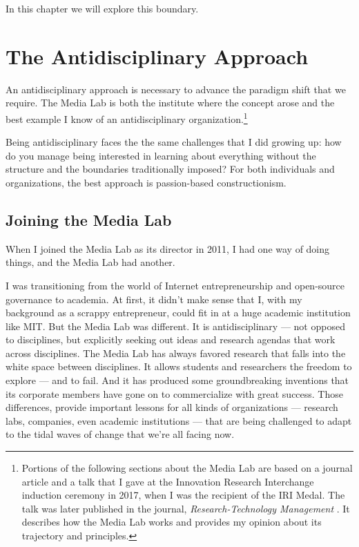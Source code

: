 In this chapter we will explore this boundary.

\section{The Antidisciplinary Approach}
\label{antidisciplinaryapproach}

An antidisciplinary approach is necessary to advance the paradigm shift that we require. The Media Lab is both the institute where the concept arose and the best example I know of an antidisciplinary organization.\footnote{Portions of the following sections about the Media Lab are based on a journal article and a talk that I gave at the Innovation Research Interchange induction ceremony in 2017, when I was the recipient of the IRI Medal. The talk was later published in the journal, \textit{Research-Technology Management} \cite{ito2017antidisciplinary}. It describes how the Media Lab works and provides my opinion about its trajectory and principles.}

Being antidisciplinary faces the the same challenges that I did growing up: how do you manage being interested in learning about everything without the structure and the boundaries traditionally imposed? For both individuals and organizations, the best approach is passion-based constructionism.

\subsection{Joining the Media Lab}

When I joined the Media Lab as its director in 2011, I had one way of doing things, and the Media Lab had another. 

I was transitioning from the world of Internet entrepreneurship and open-source governance to academia. At first, it didn't make sense that I, with my background as a scrappy entrepreneur, could fit in at a huge academic institution like MIT. But the Media Lab was different. It is antidisciplinary --- not opposed to disciplines, but explicitly seeking out ideas and research agendas that work across disciplines. The Media Lab has always favored research that falls into the white space between disciplines. It allows students and researchers the freedom to explore --- and to fail. And it has produced some groundbreaking inventions that its corporate members have gone on to commercialize with great success. Those differences, provide important lessons for all kinds of organizations --- research labs, companies, even academic institutions --- that are being challenged to adapt to the tidal waves of change that we're all facing now. 

